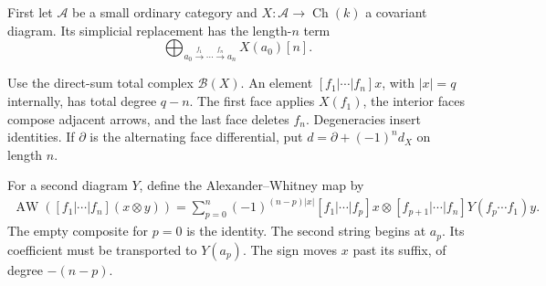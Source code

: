 First let $\mathcal A$ be a small ordinary
category and $X:\mathcal A\to\operatorname{Ch}(k)$
a covariant diagram. Its simplicial replacement
has the length-$n$ term
\[
 \bigoplus_{a_0\xrightarrow{f_1}\cdots
                    \xrightarrow{f_n}a_n}X(a_0)[n].
\]

Use the direct-sum total complex $\mathcal B(X)$.
An element $[f_1|\cdots|f_n]x$, with $|x|=q$
internally, has total degree $q-n$.
The first face applies $X(f_1)$, the interior
faces compose adjacent arrows, and the last
face deletes $f_n$. Degeneracies insert identities.
If $\partial$ is the alternating face differential,
put $d=\partial+(-1)^nd_X$ on length $n$.

For a second diagram $Y$, define the
Alexander--Whitney map by
\begin{equation}\label{cbc:va:aw}
\begin{aligned}
 \operatorname{AW}([f_1|\cdots|f_n](x\otimes y))
  =\sum_{p=0}^n(-1)^{(n-p)|x|}
    [f_1|\cdots|f_p]x\otimes
    [f_{p+1}|\cdots|f_n]Y(f_p\cdots f_1)y.
\end{aligned}
\end{equation}
The empty composite for $p=0$ is the identity.
The second string begins at $a_p$. Its coefficient
must be transported to $Y(a_p)$.
The sign moves $x$ past its suffix, of degree
$-(n-p)$.

